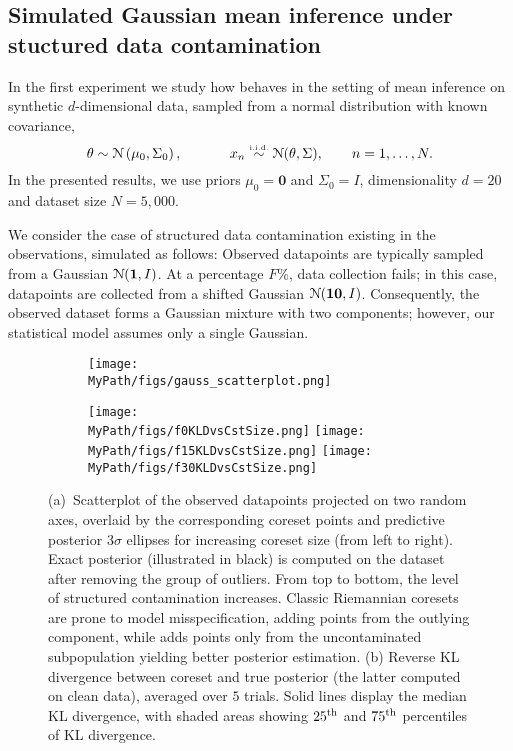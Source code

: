 \subsection{Simulated Gaussian mean inference under stuctured data contamination}
\label{subsec:gauss-expt}

In the first experiment we study how \bcores{} behaves in the setting of mean inference on synthetic $d$-dimensional data, sampled \iid from a normal distribution with known covariance,
\[
\theta \sim \distNorm\left(\mu_0, \Sigma_0\right),
\qquad 
\;\;\;\;\;
x_n \distiid \distNorm(\theta, \Sigma),
\qquad
n = 1, \ldots, N.
\label{eq:mvn-expt}
\]
In the presented results, we use priors $\mu_0=\mathbf{0}$ and $\Sigma_0=I$,  dimensionality $d=20$ and dataset size $N=5,000$.
 
We consider the case of structured data contamination existing in the observations, simulated as follows: Observed datapoints are typically sampled from a Gaussian $ \mathcal{N}(\mathbf{1}, I)$. At a percentage $F\%$,  data collection fails; in this case, datapoints are collected from a shifted Gaussian $ \mathcal{N}(\mathbf{10}, I)$. Consequently, the observed dataset forms a Gaussian mixture with two components; however, our statistical model assumes only a single Gaussian.

\begin{figure}[!htp]
	\centering 
	\begin{subfigure}[ht]{0.96\textwidth} 
		\texttt{[image: \\MyPath/figs/gauss\_scatterplot.png]}
		\caption{\label{fig:beta_gaussian_coreset_points}}
	\end{subfigure}
	\hfill\qquad
	\begin{subfigure}[ht]{0.96\textwidth} 
		\centering
		\texttt{[image: \\MyPath/figs/f0KLDvsCstSize.png]}
		\centering
		\hfill
		\texttt{[image: \\MyPath/figs/f15KLDvsCstSize.png]}
		\centering
		\hfill
		\texttt{[image: \\MyPath/figs/f30KLDvsCstSize.png]}
		\caption{\label{fig:gauss_kld}}
	\end{subfigure}	
	\centering
	\caption{(a)~Scatterplot of the observed datapoints projected on two random axes, overlaid by the corresponding coreset points and predictive posterior $3\sigma$ ellipses for increasing coreset size (from left to right). Exact posterior (illustrated in black) is computed on the dataset after removing the group of outliers. From top to bottom, the level of structured contamination increases. Classic Riemannian coresets are prone to model misspecification, adding points from the outlying component, while \bcores{} adds points only from the uncontaminated subpopulation yielding better posterior estimation. (b) Reverse KL divergence between coreset and true posterior (the latter computed on clean data), averaged over $5$ trials. Solid lines display the median KL divergence, with shaded areas showing $25\textsuperscript{th}$ and $75\textsuperscript{th}$ percentiles of KL divergence.}
\end{figure}

